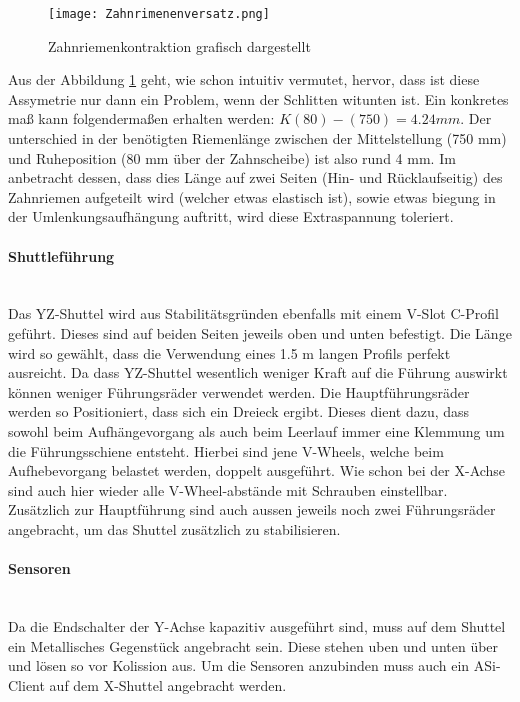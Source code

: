     \begin{figure}[H]
        \centering
        \texttt{[image: Zahnrimenenversatz.png]}
        \caption{Zahnriemenkontraktion grafisch dargestellt}
        \label{zahnriemenversatz}
    \end{figure}

Aus der Abbildung \ref{zahnriemenversatz} geht, wie schon intuitiv vermutet, hervor, dass ist diese Assymetrie nur dann ein Problem, wenn der Schlitten witunten ist. Ein konkretes maß kann folgendermaßen erhalten werden: \(K(80) - (750) = 4.24 \unit{mm}\). Der unterschied in der benötigten Riemenlänge zwischen der Mittelstellung (750 mm) und Ruheposition (80 mm über der Zahnscheibe) ist also rund 4 mm. Im anbetracht dessen, dass dies Länge auf zwei Seiten (Hin- und Rücklaufseitig) des Zahnriemen aufgeteilt wird (welcher etwas elastisch ist), sowie etwas biegung in der Umlenkungsaufhängung auftritt, wird diese Extraspannung toleriert.

\paragraph{Shuttleführung}\mbox{}\\
Das YZ-Shuttel wird aus Stabilitätsgründen ebenfalls mit einem V-Slot C-Profil geführt. Dieses sind auf beiden Seiten jeweils oben und unten befestigt. Die Länge wird so gewählt, dass die Verwendung eines 1.5 m langen Profils perfekt ausreicht. Da dass YZ-Shuttel wesentlich weniger Kraft auf die Führung auswirkt können weniger Führungsräder verwendet werden. Die Hauptführungsräder werden so Positioniert,  dass sich ein Dreieck ergibt. Dieses dient dazu, dass sowohl beim Aufhängevorgang als auch beim Leerlauf immer eine Klemmung um die Führungsschiene entsteht. Hierbei sind jene V-Wheels, welche beim Aufhebevorgang belastet werden, doppelt ausgeführt. Wie schon bei der X-Achse sind auch hier wieder alle V-Wheel-abstände mit Schrauben einstellbar. Zusätzlich zur Hauptführung sind auch aussen jeweils noch zwei Führungsräder angebracht, um das Shuttel zusätzlich zu stabilisieren.

\paragraph{Sensoren}\mbox{}\\
Da die Endschalter der Y-Achse kapazitiv ausgeführt sind, muss auf dem Shuttel ein Metallisches Gegenstück angebracht sein. Diese stehen uben und unten über und lösen so vor Kolission aus. Um die Sensoren anzubinden muss auch ein ASi-Client auf dem X-Shuttel angebracht werden.

